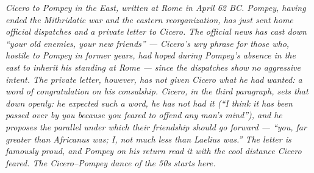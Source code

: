 
\textit{Cicero to Pompey in the East, written at Rome in
April 62 BC. Pompey, having ended the Mithridatic war and
the eastern reorganization, has just sent home official
dispatches and a private letter to Cicero. The official
news has cast down ``your old enemies, your new friends''
--- Cicero's wry phrase for those who, hostile to Pompey
in former years, had hoped during Pompey's absence in the
east to inherit his standing at Rome --- since the
dispatches show no aggressive intent. The private letter,
however, has not given Cicero what he had wanted: a word
of congratulation on his consulship. Cicero, in the third
paragraph, sets that down openly: he expected such a word,
he has not had it (``I think it has been passed over by
you because you feared to offend any man's mind''), and he
proposes the parallel under which their friendship should
go forward --- ``you, far greater than Africanus was; I,
not much less than Laelius was.'' The letter is famously
proud, and Pompey on his return read it with the cool
distance Cicero feared. The Cicero--Pompey dance of the
50s starts here.}
